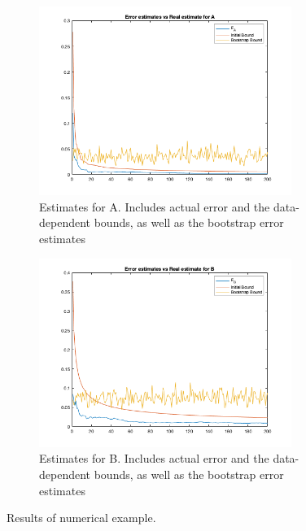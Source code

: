 \documentclass{article}[12pt]
\begin{document}
\begin{figure}[t!]
	\centering
	\begin{subfigure}{0.5\textwidth}
		\centering
		\includegraphics[width=0.9\textwidth]{E_A_results.png}
		\caption{\small Estimates for A. Includes actual error and the data-dependent bounds, as well as the bootstrap error estimates}
		\label{fig:e_a}
	\end{subfigure}%
	\begin{subfigure}{0.5\textwidth}
		\centering
		\includegraphics[width=0.9\textwidth]{E_B_results.png}
		\caption{\small Estimates for B. Includes actual error and the data-dependent bounds, as well as the bootstrap error estimates}
		\label{fig:e_b}
	\end{subfigure}
	\caption{Results of numerical example.}
\end{figure}
\end{document}
